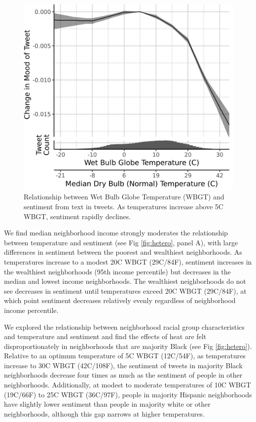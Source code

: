\documentclass[fleqn,10pt]{wlscirep}
\begin{document}
\begin{figure}[H]
  \centering
  \includegraphics[width=0.5\linewidth]{../res/wbgt.png}
  \caption{Relationship between Wet Bulb Globe Temperature (WBGT) and sentiment from text in tweets.  As temperatures increase above 5\textdegree C WBGT, sentiment rapidly declines.}
  \label{fig:wbgt}
\end{figure}

We find median neighborhood income strongly moderates the relationship between temperature and sentiment (see Fig \ref{fig:hetero}, panel A), with large differences in sentiment between the poorest and wealthiest neighborhoods. As temperatures increase to a modest 20\textdegree C WBGT (29\textdegree C/84\textdegree F), sentiment increases in the wealthiest neighborhoods (95th income percentile) but decreases in the median and lowest income neighborhoods. The wealthiest neighborhoods do not see decreases in sentiment until temperatures exceed 20\textdegree C WBGT (29\textdegree C/84\textdegree F), at which point sentiment decreases relatively evenly regardless of neighborhood income percentile.

We explored the relationship between neighborhood racial group characteristics and temperature and sentiment and find the effects of heat are felt disproportionately in neighborhoods that are majority Black (see Fig \ref{fig:hetero}). Relative to an optimum temperature of 5\textdegree C WBGT (12\textdegree C/54\textdegree F), as temperatures increase to 30\textdegree C WBGT (42\textdegree C/108\textdegree F), the sentiment of tweets in majority Black neighborhoods decrease four times as much as the sentiment of people in other neighborhoods. Additionally, at modest to moderate temperatures of 10\textdegree C WBGT (19\textdegree C/66\textdegree F) to 25\textdegree C WBGT (36\textdegree C/97\textdegree F), people in majority Hispanic neighborhoods have slightly lower sentiment than people in majority white or other neighborhoods, although this gap narrows at higher temperatures.
\end{document}
